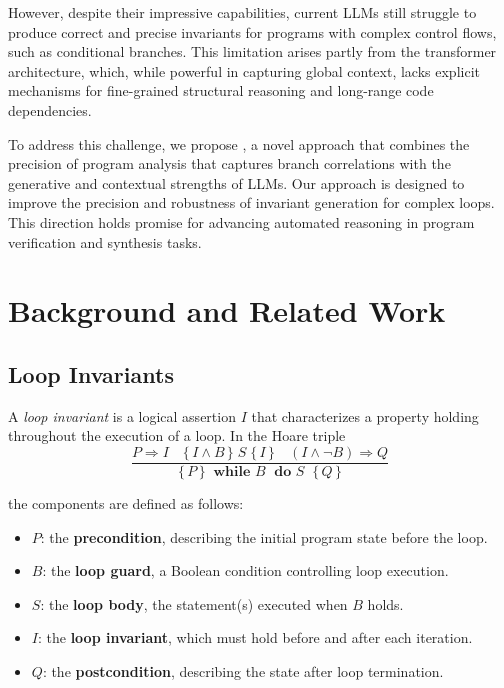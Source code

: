 \documentclass[letterpaper]{article} %
\begin{document}
However, despite their impressive capabilities, current LLMs still struggle to produce correct and precise invariants for programs with complex control flows, such as conditional branches. This limitation arises partly from the transformer architecture, which, while powerful in capturing global context, lacks explicit mechanisms for fine-grained structural reasoning and long-range code dependencies.

To address this challenge, we propose \thistool, a novel approach that combines the precision of program analysis that captures branch correlations with the generative and contextual strengths of LLMs. Our approach is designed to improve the precision and robustness of invariant generation for complex loops. This direction holds promise for advancing automated reasoning in program verification and synthesis tasks.



\section{Background and Related Work}

\subsection{Loop Invariants}

\noindent
A \textit{loop invariant} is a logical assertion $I$ that characterizes a property 
holding throughout the execution of a loop.  
In the Hoare triple
\[
\frac{
   P \Rightarrow I 
   \quad 
   \{\, I \wedge B \,\}\; S \;\{\, I \,\} 
   \quad 
   (I \wedge \lnot B) \Rightarrow Q
}{
   \{\, P \,\}\;\;\textbf{while } B \;\textbf{ do } S\;\;\{\, Q \,\}
}
\]

the components are defined as follows:
\begin{itemize}
    \item $P$: the \textbf{precondition}, describing the initial program state before the loop.
    \item $B$: the \textbf{loop guard}, a Boolean condition controlling loop execution.
    \item $S$: the \textbf{loop body}, the statement(s) executed when $B$ holds.
    \item $I$: the \textbf{loop invariant}, which must hold before and after each iteration.
    \item $Q$: the \textbf{postcondition}, describing the state after loop termination.
\end{itemize}
\end{document}

